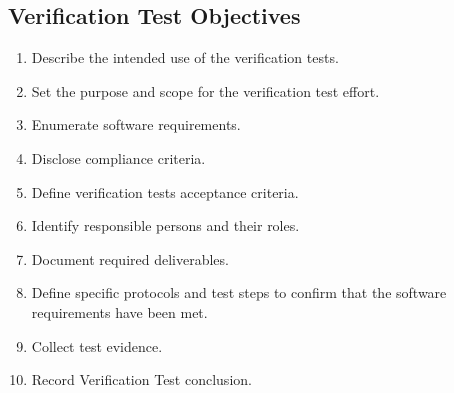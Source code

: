 \subsection{Verification Test Objectives}
\begin{enumerate}
  \item Describe the intended use of the verification tests.
  \item Set the purpose and scope for the verification test effort.
  \item Enumerate software requirements.
  \item Disclose compliance criteria.
  \item Define verification tests acceptance criteria.
  \item Identify responsible persons and their roles.
  \item Document required deliverables.
  \item Define specific protocols and test steps to confirm that the software
        requirements have been met.
  \item Collect test evidence.
  \item Record Verification Test conclusion.
\end{enumerate}


